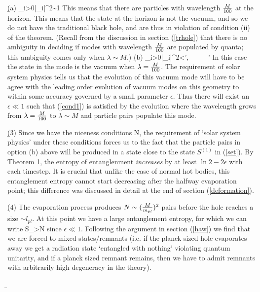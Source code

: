 \documentclass[12pt]{article}
\begin{document}
\b

(a) 
\be
\sum_{i>0}|\alpha_i|^2\sim 1
\ee
This means that there are particles with wavelength ${M\over 100}$ at the horizon. This means that the state at the horizon is not the vacuum, and so we do not have the traditional black hole, and are thus in violation of condition (ii) of the theorem. (Recall from the discussion in section (\ref{trhole}) that there is no ambiguity  in deciding if modes with wavelength ${M\over 100}$ are populated by quanta; this ambiguity comes only when $\lambda\sim M$.)
\b

(b) 
\be
\sum_{i>0}|\alpha_i|^2<\epsilon',~~ ~~~\epsilon'
\label{bound}
\ee
In this case the state in the mode is the vacuum when $\lambda={M\over 100}$. The requirement of solar system physics tells us that the evolution of this vacuum mode will have to be agree with the leading order evolution of vacuum modes on this geometry to within some accuracy governed by a small parameter $\epsilon$. Thus there will exist an $\epsilon\ll 1$ such that  (\ref{cond1}) is satisfied by the evolution where the wavelength grows from $\lambda={M\over 100}$ to $\lambda\sim M$ and particle pairs populate this mode.

\b

(3) Since we have the niceness conditions N, the requirement of `solar system physics' under these conditions forces us to the fact that the particle pairs in option (b) above will be produced in a state close to the state $S^{(1)}$ in (\ref{set}). By Theorem 1, the entropy of entanglenment {\it increases} by at least $\ln 2-2\epsilon$ with each timestep. It is crucial that unlike the case of normal hot bodies, this entanglement entropy cannot start decreasing after the halfway evaporation point; this difference was discussed in detail at the end of section (\ref{deformation}).

\b

(4) The evaporation process produces $N\sim ({M\over m_{pl}})^2$ pairs before the hole reaches a size $\sim l_{pl}$. At this point we have a large entanglement entropy, for which we can write 
\be
S_{}>{N}
\ee
since $\epsilon \ll 1$. Following the argument in section (\ref{haw}) we find that we are forced to mixed states/remnants (i.e. if the planck sized hole evaporates away we get a radiation state `entangled with nothing' violating quantum unitarity, and if a planck sized remnant remains, then we have to admit remnants with arbitrarily high degeneracy in the theory). 

\b
\end{document}
